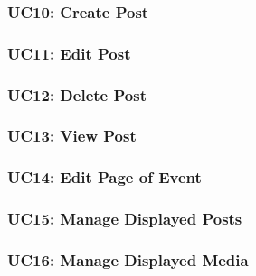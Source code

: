 \documentclass{article}
\begin{document}
\subsubsection{UC10: Create Post}

\subsubsection{UC11: Edit Post}

\subsubsection{UC12: Delete Post}

\subsubsection{UC13: View Post}

\subsubsection{UC14: Edit Page of Event}

\subsubsection{UC15: Manage Displayed Posts}

\subsubsection{UC16: Manage Displayed Media}

\end{document}
